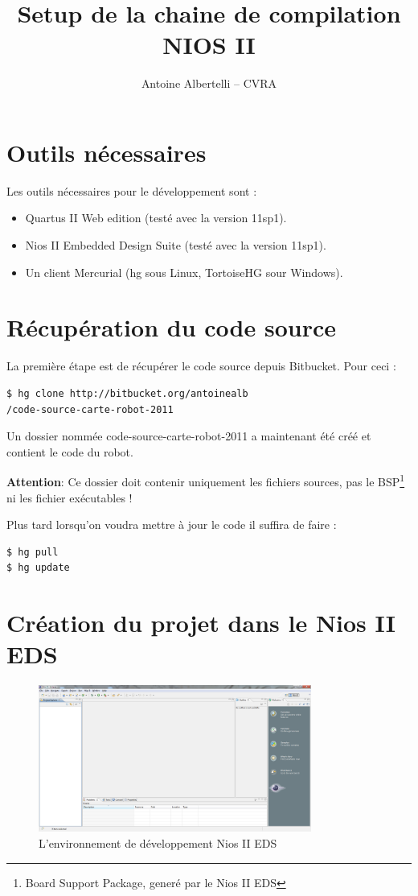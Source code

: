 \documentclass[a4paper]{paper}
\author{Antoine Albertelli -- CVRA}
\title{Setup de la chaine de compilation NIOS II}
\begin{document}
\maketitle
\tableofcontents
 
\section{Outils nécessaires}

Les outils nécessaires pour le développement sont :
\begin{itemize}
\item Quartus II Web edition (testé avec la version 11sp1).
\item Nios II Embedded Design Suite (testé avec la version 11sp1).
\item Un client Mercurial (hg sous Linux, TortoiseHG sour Windows).
\end{itemize}

\section{Récupération du code source}
La première étape est de récupérer le code source depuis Bitbucket.
Pour ceci :
\begin{lstlisting}[frame=trBL]
$ hg clone http://bitbucket.org/antoinealb
/code-source-carte-robot-2011
\end{lstlisting}

Un dossier nommée code-source-carte-robot-2011 a maintenant été créé et contient le code du robot.

\textbf{Attention}: Ce dossier doit contenir uniquement les fichiers sources, pas le BSP\footnote{Board Support Package, generé par le Nios II EDS} ni les fichier exécutables !


Plus tard lorsqu'on voudra mettre à jour le code il suffira de faire :
\begin{lstlisting}[frame=trBL]
$ hg pull
$ hg update
\end{lstlisting}

\section{Création du projet dans le Nios II EDS}

\begin{figure}[h!]
  \centering
    \includegraphics[width=0.8\textwidth]{1}
  \caption{L'environnement de développement Nios II EDS}
\end{figure}
\end{document}
